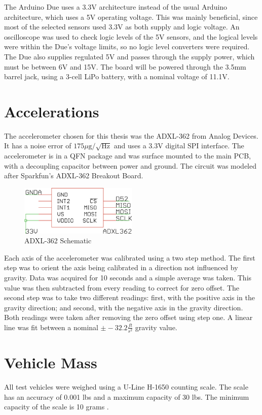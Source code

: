 The Arduino Due uses a 3.3V architecture instead of the usual Arduino architecture, which uses a 5V operating voltage. This was mainly beneficial, since most of the selected sensors used 3.3V as both supply and logic voltage. An oscilloscope was used to check logic levels of the 5V sensors, and the logical levels were within the Due's voltage limits, so no logic level converters were required. The Due also supplies regulated 5V and passes through the supply power, which must be between 6V and 15V. The board will be powered through the 3.5mm barrel jack, using a 3-cell LiPo battery, with a nominal voltage of 11.1V.

\section{Accelerations}
The accelerometer chosen for this thesis was the ADXL-362 from Analog Devices. It has a noise error of $175\mu\text{g}/\sqrt{\text{Hz}}$ and uses a 3.3V digital SPI interface\cite{adxl362DataSheet}. The accelerometer is in a QFN package and was surface mounted to the main PCB, with a decoupling capacitor between power and ground. The circuit was modeled after Sparkfun's ADXL-362 Breakout Board\cite{Sparkfunadxl362BOB}.
\begin{figure}[h!]
  \caption{ADXL-362 Schematic} \label{adxl362Schematic}
  \centering
    \includegraphics[width=0.5\textwidth]{figures/adxl362.eps}
\end{figure}

Each axis of the accelerometer was calibrated using a two step method. The first step was to orient the axis being calibrated in a direction not influenced by gravity. Data was acquired for 10 seconds and a simple average was taken. This value was then subtracted from every reading to correct for zero offset. The second step was to take two different readings: first, with the positive axis in the gravity direction; and second, with the negative axis in the gravity direction. Both readings were taken after removing the zero offset using step one. A linear line was fit between a nominal $\pm-32.2 \frac{ft}{s^2}$ gravity value.
\section{Vehicle Mass}
All test vehicles were weighed using a U-Line H-1650 counting scale. The scale has an accuracy of 0.001 lbs and a maximum capacity of 30 lbs. The minimum capacity of the scale is 10 grams \cite{U-Line}.
